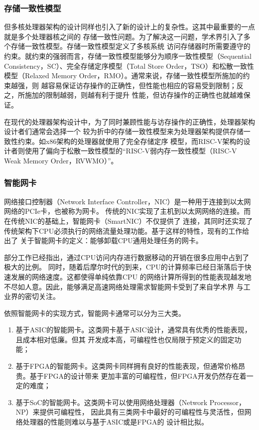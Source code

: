 \subsubsection{存储一致性模型}
\label{section:background_consistent_model}

但多核处理器架构的设计同样也引入了新的设计上的复杂性。这其中最重要的一点就是多个处理器核之间的
存储一致性问题。为了解决这一问题，学术界引入了多个存储一致性模型。存储一致性模型定义了多核系统
访问存储器时所需要遵守的约束。就约束的强弱而言，存储一致性模型能够分为顺序一致性模型（Sequential
Consistency，SC）、完全存储定序模型（Total Store Order，TSO）和松散一致性模型（Relaxed
Memory Order，RMO）\cite{sorin2011primer}。通常来说，存储一致性模型所施加的约束越强，则
越容易保证访存操作的正确性，但性能也相应的容易受到限制；反之，所施加的限制越弱，则越有利于提升
性能，但访存操作的正确性也就越难保证。

在现代的处理器架构设计中，为了同时兼顾性能与访存操作的正确性，处理器架构设计者们通常会选择一个
较为折中的存储一致性模型来为处理器架构提供存储一致性约束。如x86架构的处理器就使用了完全存储定序
模型，而RISC-V架构的设计者则使用了偏向于松散一致性模型的“RISC-V弱内存一致性模型（RISC-V Weak
Memory Order，RVWMO）”\cite{waterman2016design,waterman2014risc,waterman2015risc}。

\subsubsection{智能网卡}
\label{section:background_smartnic}

网络接口控制器（Network Interface Controller，NIC）是一种用于连接到以太网网络的PCIe卡，也被称为网卡。
传统的NIC实现了主机到以太网网络的连接。而在传统NIC的基础上，智能网卡（SmartNIC）不仅提供了
连接，其同时还实现了传统架构下CPU必须执行的网络流量处理功能。基于这样的特性，现有的工作给出了
关于智能网卡的定义：能够卸载CPU通用处理任务的网卡\cite{pcmag_smartnic,maxiaoxiao2022survey}。

部分工作已经指出，通过CPU访问内存进行数据移动的开销在很多应用中占到了极大的比例\cite{maxiaoxiao2022survey}。
同时，随着后摩尔时代的到来，CPU的计算频率已经日渐落后于快速发展的网络速度。这都使得单纯依靠CPU
的网络计算所得到的性能表现越发地不尽如人意。因此，能够满足高速网络处理需求智能网卡受到了来自学术界
与工业界的密切关注。

依照智能网卡的实现方式，智能网卡通常可以分为三大类\cite{bhalgat2021smartnic}。

\begin{enumerate}
  \item 基于ASIC的智能网卡。这类网卡基于ASIC设计，通常具有优秀的性能表现，且成本相对低廉。但其
        开发成本高，可编程性也仅局限于预定义的固定功能；
  \item 基于FPGA的智能网卡。这类网卡同样拥有良好的性能表现，但通常价格昂贵。基于FPGA的设计带来
        更加丰富的可编程性，但FPGA开发仍然存在着一定的难度；
  \item 基于SoC的智能网卡。这类网卡可以使用网络处理器（Network Processor，NP）来提供可编程性，
        因此具有三类网卡中最好的可编程性与灵活性，但网络处理器的性能则难以与基于ASIC或是FPGA的
        设计相比拟。
\end{enumerate}

